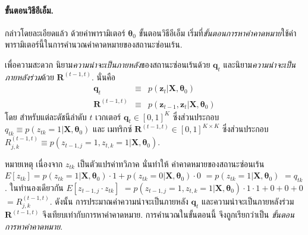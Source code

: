 \paragraph{ขั้นตอนวิธีอีเอ็ม.}
กล่าวโดยละเอียดแล้ว 
ด้วยค่าพารามิเตอร์ $\bm{\theta}_0$
ขั้นตอนวิธีอีเอ็ม เริ่มที่\textit{ขั้นตอนการหาค่าคาดหมาย}ใช้ค่าพารามิเตอร์นี้ในการคำนวณค่าคาดหมายของสถานะซ่อนเร้น.

เพื่อความสะดวก นิยาม\textit{ความน่าจะเป็นภายหลัง}ของสถานะซ่อนเร้นด้วย $\bm{q}_t$ และนิยาม\textit{ความน่าจะเป็นภายหลังร่วม}ด้วย $\bm{R}^{(t-1,t)}$.
นั่นคือ 
\begin{eqnarray}
\bm{q}_t &\equiv& p(\bm{z}_t|\bm{X}, \bm{\theta}_0)
\label{eq: seq HMM q}  \\
\bm{R}^{(t-1, t)} &\equiv& p(\bm{z}_{t-1}, \bm{z}_t|\bm{X}, \bm{\theta}_0)
\label{eq: seq HMM r} 
\end{eqnarray}
โดย สำหรับแต่ละดัชนีลำดับ $t$
เวกเตอร์ $\bm{q}_t \in [0,1]^K$ 
ซึ่งส่วนประกอบ $q_{tk} \equiv p(z_{tk} = 1|\bm{X}, \bm{\theta}_0)$
และ เมทริกซ์ $\bm{R}^{(t-1,t)} \in [0,1]^{K \times K}$
ซึ่งส่วนประกอบ $R^{(t-1,t)}_{j,k} \equiv p(z_{t-1,j} = 1, z_{t,k}=1|\bm{X}, \bm{\theta}_0)$.
	
หมายเหตุ 
เนื่องจาก $z_{tk}$ เป็นตัวแปรค่าทวิภาค 
นั่นทำให้ ค่าคาดหมายของสถานะซ่อนเร้น
$E[z_{tk}] = p(z_{tk}=1|\bm{X}, \bm{\theta}_0) \cdot 1 + p(z_{tk}=0|\bm{X}, \bm{\theta}_0) \cdot 0$ $= p(z_{tk}=1|\bm{X}, \bm{\theta}_0)$ $=q_{tk}$.
ในทำนองเดียวกัน 
$E[z_{t-1,j} \cdot z_{tk}]$
$=p(z_{t-1,j} = 1, z_{t,k}=1|\bm{X}, \bm{\theta}_0) \cdot 1 \cdot 1 + 0 + 0 + 0$
$=R^{(t-1,t)}_{j,k}$.
ดังนั้น การประมาณค่าความน่าจะเป็นภายหลัง $\bm{q}_t$ และความน่าจะเป็นภายหลังร่วม $\bm{R}^{(t-1,t)}$ จึงเทียบเท่ากับการหาค่าคาดหมาย.
การคำนวณในขั้นตอนนี้ จึงถูกเรียกว่าเป็น \textit{ขั้นตอนการหาค่าคาดหมาย}.

